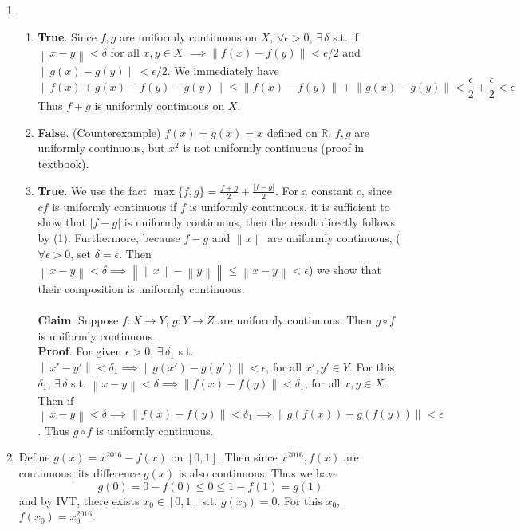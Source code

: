 \documentclass[11pt]{report}
\newcommand{\norm}[1]{\left\lVert#1\right\rVert}
\newcommand{\ra}{\rightarrow}
\newcommand{\abs}[1]{\left|#1\right|}
\newcommand{\imp}{\implies}
\newcommand{\R}{\mathbb{R}}
\begin{document}
\begin{enumerate}
\item
\begin{enumerate}
	\item \textbf{True}. Since $f, g$ are uniformly continuous on $X$, $\forall \epsilon > 0$, $\exists\,\delta$ s.t. if $\norm{x - y} <\delta$ for all $x, y\in X$ $\imp \norm{f(x)-f(y)} < \epsilon/2$ and $\norm{g(x) - g(y)} < \epsilon/2$. We immediately have
	$$\norm{f(x) + g(x) - f(y) - g(y)} \leq \norm{f(x) - f(y)} + \norm{g(x) - g(y)} < \frac{\epsilon}{2}+ \frac{\epsilon}{2} < \epsilon$$ Thus $f+g$ is uniformly continuous on $X$.
	\item \textbf{False}. (Counterexample) $f(x) = g(x) = x$ defined on $\R$. $f, g$ are uniformly continuous, but $x^2$ is not uniformly continuous (proof in textbook).
	\item \textbf{True}. We use the fact $\max\{f, g\} = \frac{f+g}{2} + \frac{\abs{f-g}}{2}$. For a constant $c$, since $cf$ is uniformly continuous if $f$ is uniformly continuous, it is sufficient to show that $\abs{f-g}$ is uniformly continuous, then the result directly follows by (1). Furthermore, because $f-g$ and $\norm{x}$ are uniformly continuous, ($\forall \epsilon > 0$, set $\delta = \epsilon$. Then $\norm{x - y} < \delta \imp \norm{\norm{x} - \norm{y}} \leq \norm{x - y} <\epsilon$) we show that their composition is uniformly continuous.\\
	\\
	\textbf{Claim}. Suppose $f:X\ra Y$, $g: Y\ra Z$ are uniformly continuous. Then $g\circ f$ is uniformly continuous.\\
	\textbf{Proof}. For given $\epsilon > 0$, $\exists\,\delta_1$ s.t. $\norm{x' - y'} < \delta_1 \imp \norm{g(x') - g(y')} < \epsilon$, for all $x', y'\in Y$. For this $\delta_1$, $\exists\,\delta$ s.t. $\norm{x-y} < \delta \imp \norm{f(x)-f(y)} < \delta_1$, for all $x, y\in X$. Then if $\norm{x - y} < \delta \imp \norm{f(x) - f(y)} < \delta_1 \imp \norm{g(f(x)) - g(f(y))} < \epsilon$. Thus $g\circ f$ is uniformly continuous.
\end{enumerate}

\item Define $g(x) = x^{2016} - f(x)$ on $[0, 1]$. Then since $x^{2016}, f(x)$ are continuous, its difference $g(x)$ is also continuous. Thus we have $$g(0) = 0 - f(0) \leq 0 \leq 1-f(1) = g(1)$$and by IVT, there exists $x_0\in [0, 1]$ s.t. $g(x_0) = 0$. For this $x_0$, $f(x_0) = x_0^{2016}$.


\end{enumerate}
\end{document}
